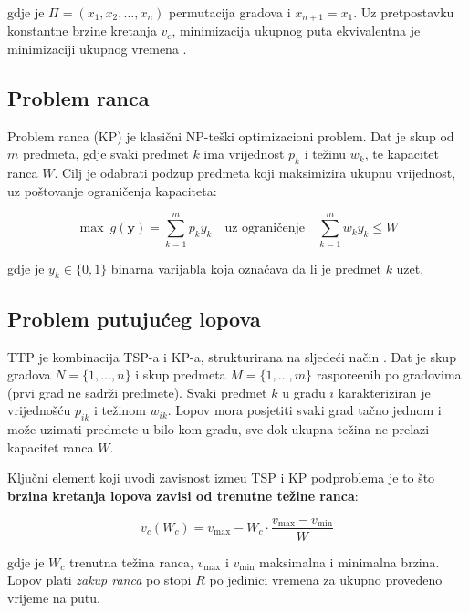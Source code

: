 \documentclass[12pt,a4paper]{article}
\begin{document}
gdje je $\Pi = (x_1, x_2, \ldots, x_n)$ permutacija gradova i $x_{n+1} = x_1$. Uz pretpostavku konstantne brzine kretanja $v_c$, minimizacija ukupnog puta ekvivalentna je minimizaciji ukupnog vremena \cite{bonyadi2013}.

\subsection{Problem ranca}

Problem ranca (KP) je klasični NP-te\v{s}ki optimizacioni problem. Dat je skup od $m$ predmeta, gdje svaki predmet $k$ ima vrijednost $p_k$ i te\v{z}inu $w_k$, te kapacitet ranca $W$. Cilj je odabrati podzup predmeta koji maksimizira ukupnu vrijednost, uz po\v{s}tovanje ograni\v{c}enja kapaciteta:

\begin{equation}
    \max \ g(\mathbf{y}) = \sum_{k=1}^{m} p_k y_k \quad \text{uz ograni\v{c}enje} \quad \sum_{k=1}^{m} w_k y_k \leq W
\end{equation}

gdje je $y_k \in \{0, 1\}$ binarna varijabla koja ozna\v{c}ava da li je predmet $k$ uzet.

\subsection{Problem putuju\'{c}eg lopova}

TTP je kombinacija TSP-a i KP-a, strukturirana na sljede\'{c}i na\v{c}in \cite{polyakovskiy2014}. Dat je skup gradova $N = \{1, \ldots, n\}$ i skup predmeta $M = \{1, \ldots, m\}$ raspore\dj{}enih po gradovima (prvi grad ne sadr\v{z}i predmete). Svaki predmet $k$ u gradu $i$ karakteriziran je vrijednoš\'{c}u $p_{ik}$ i te\v{z}inom $w_{ik}$. Lopov mora posjetiti svaki grad ta\v{c}no jednom i mo\v{z}e uzimati predmete u bilo kom gradu, sve dok ukupna te\v{z}ina ne prelazi kapacitet ranca $W$.

Klju\v{c}ni element koji uvodi zavisnost izme\dj{}u TSP i KP podproblema je to \v{s}to \textbf{brzina kretanja lopova zavisi od trenutne te\v{z}ine ranca}:

\begin{equation}
    v_c(W_c) = v_{\max} - W_c \cdot \frac{v_{\max} - v_{\min}}{W}
    \label{eq:speed}
\end{equation}

gdje je $W_c$ trenutna te\v{z}ina ranca, $v_{\max}$ i $v_{\min}$ maksimalna i minimalna brzina. Lopov plati \textit{zakup ranca} po stopi $R$ po jedinici vremena za ukupno provedeno vrijeme na putu.
\end{document}
